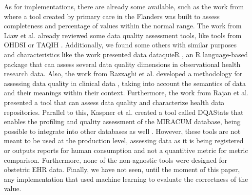 As for implementations, there are already some available, such as the work from \cite{phanAutomatedDataCleaning2020} where a tool created by primary care in the Flanders was built to assess completeness and percentage of values within the normal range.
The work from Liaw et al. \cite{liawQualityAssessmentRealworld2021} already reviewed some data quality assessment tools, like tools from OHDSI \cite{hripcsakObservationalHealthData2015} or TAQIH \cite{alvarezsanchezTAQIHToolTabular2019}. 
Additionally, we found some others with similar purposes and characteristics like the work presented data dataquieR \cite{schmidtFacilitatingHarmonizedData2021}, an R language-based package that can assess several data quality dimensions in observational health research data. 
Also, the work from Razzaghi et al. developed a methodology for assessing data quality in clinical data \cite{razzaghiDevelopingSystematicApproach2022}, taking into account the semantics of data and their meanings within their context. Furthermore, the work from Rajan et al. \cite{rajanContentAgnosticComputable2019} presented a tool that can assess data quality and characterize health data repositories. Parallel to this, Kaspner et al. created a tool called DQAStats that enables the profiling and quality assessment of the MIRACUM database, being possible to integrate into other databases as well \cite{kapsnerLinkingConsortiumWideData2021a}.
However, these tools are not meant to be used at the production level, assessing data as it is being registered or outputs reports for human consumption and not a quantitive metric for metric comparison. Furthermore, none of the non-agnostic tools were designed for obstetric EHR data. Finally, we have not seen, until the moment of this paper, any implementation that used machine learning to evaluate the correctness of the value.

